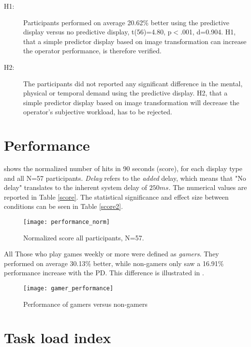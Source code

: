 \begin{description}
\item[H1:] Participants performed on average 20.62\% better using the predictive display versus no predictive display, t(56)=4.80, p$<$.001, d=0.904. H1, that a simple predictor display based on image transformation can increase the operator performance, is therefore verified.

\item[H2:] The participants did not reported any significant difference in the mental, physical or temporal demand using the predictive display. H2, that a simple predictor display based on image transformation will decrease the operator's subjective workload, has to be rejected. 
\end{description}
\vspace{-5mm}
\section{Performance}

 shows the normalized number of hits in 90 seconds (score), for each display type and all N=57 participants. \textit{Delay} refers to the \textit{added} delay, which means that "No delay" translates to the inherent system delay of $250 ms$. The numerical values are reported in Table \ref{score}. The statistical significance and effect size between conditions can be seen in Table \ref{score2}.

\begin{figure}[h!]
    \centering
    \texttt{[image: performance\_norm]}
    \caption{Normalized score all participants, N=57.}
    \label{performanceNorm}
	\vspace{-0.2cm}
\end{figure}

All  Those who play games weekly or more were defined as \emph{gamers}. They performed on average 30.13\% better, while non-gamers only saw a 16.91\% performance increase with the PD. This difference is illustrated in .




\begin{figure}[h!]
    \centering
    \texttt{[image: gamer\_performance]}
    \caption{Performance of gamers versus non-gamers}
    \label{gamer_performance}
\end{figure}

\clearpage
\section{Task load index}

